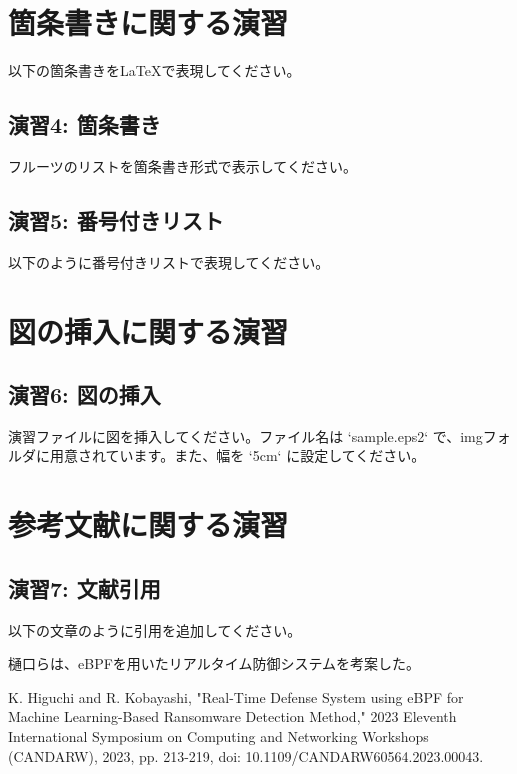 \documentclass[a4paper,12pt]{article}
\begin{document}
\section{箇条書きに関する演習}

以下の箇条書きをLaTeXで表現してください。

\subsection{演習4: 箇条書き}

フルーツのリストを箇条書き形式で表示してください。

\subsection{演習5: 番号付きリスト}

以下のように番号付きリストで表現してください。


\section{図の挿入に関する演習}

\subsection{演習6: 図の挿入}

演習ファイルに図を挿入してください。ファイル名は `sample.eps2` で、imgフォルダに用意されています。また、幅を `5cm` に設定してください。

\section{参考文献に関する演習}

\subsection{演習7: 文献引用}
以下の文章のように引用を追加してください。

樋口らは、eBPFを用いたリアルタイム防御システムを考案した。

\begin{thebibliography}{1}
    K. Higuchi and R. Kobayashi, "Real-Time Defense System using eBPF for Machine Learning-Based Ransomware Detection Method," 2023 Eleventh International Symposium on Computing and Networking Workshops (CANDARW), 2023, pp. 213-219, doi: 10.1109/CANDARW60564.2023.00043. 
\end{thebibliography}
\end{document}

